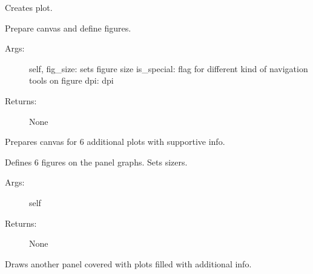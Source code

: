 \documentclass[letterpaper,10pt,english]{sphinxmanual}
\begin{document}
\begin{fulllineitems}
\begin{fulllineitems}
\begin{description}
\end{description}

\end{fulllineitems}


\begin{fulllineitems}
\label{\detokenize{GUI:GUI.MyPanel.draw_graph}}
Creates plot.

Prepare canvas and define figures.
\begin{description}
\item[{Args:}] \leavevmode
self,
fig\_size: sets figure size
is\_special: flag for different kind of navigation tools on figure
dpi: dpi

\item[{Returns:}] \leavevmode
None

\end{description}

\end{fulllineitems}


\begin{fulllineitems}
\label{\detokenize{GUI:GUI.MyPanel.draw_graphs}}
Prepares canvas for 6 additional plots with supportive info.

Defines 6 figures on the panel graphs. Sets sizers.
\begin{description}
\item[{Args:}] \leavevmode
self

\item[{Returns:}] \leavevmode
None

\end{description}

\end{fulllineitems}


\begin{fulllineitems}
\label{\detokenize{GUI:GUI.MyPanel.make_report}}
Draws another panel covered with plots filled with additional info.


\end{fulllineitems}
\end{fulllineitems}
\end{document}
